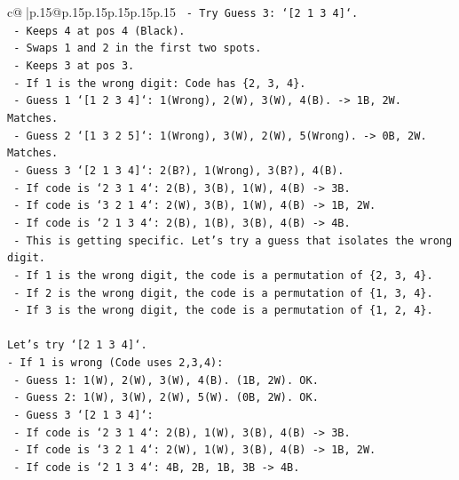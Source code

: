 \documentclass{article}
\begin{document}
{\begin{supertabular}{c@{$\;$}|p{.15\linewidth}@{}p{.15\linewidth}p{.15\linewidth}p{.15\linewidth}p{.15\linewidth}p{.15\linewidth}}
{{{\texttt{        {-} Try Guess 3: `{[}2 1 3 4{]}`.} \\
\texttt{          {-} Keeps 4 at pos 4 (Black).} \\
\texttt{          {-} Swaps 1 and 2 in the first two spots.} \\
\texttt{          {-} Keeps 3 at pos 3.} \\
\texttt{          {-} If 1 is the wrong digit: Code has \{2, 3, 4\}.} \\
\texttt{            {-} Guess 1 `{[}1 2 3 4{]}`: 1(Wrong), 2(W), 3(W), 4(B). {-}> 1B, 2W. Matches.} \\
\texttt{            {-} Guess 2 `{[}1 3 2 5{]}`: 1(Wrong), 3(W), 2(W), 5(Wrong). {-}> 0B, 2W. Matches.} \\
\texttt{            {-} Guess 3 `{[}2 1 3 4{]}`: 2(B?), 1(Wrong), 3(B?), 4(B).} \\
\texttt{              {-} If code is `2 3 1 4`: 2(B), 3(B), 1(W), 4(B) {-}> 3B.} \\
\texttt{              {-} If code is `3 2 1 4`: 2(W), 3(B), 1(W), 4(B) {-}> 1B, 2W.} \\
\texttt{              {-} If code is `2 1 3 4`: 2(B), 1(B), 3(B), 4(B) {-}> 4B.} \\
\texttt{          {-} This is getting specific. Let's try a guess that isolates the wrong digit.} \\
\texttt{          {-} If 1 is the wrong digit, the code is a permutation of \{2, 3, 4\}.} \\
\texttt{          {-} If 2 is the wrong digit, the code is a permutation of \{1, 3, 4\}.} \\
\texttt{          {-} If 3 is the wrong digit, the code is a permutation of \{1, 2, 4\}.} \\
\\ 
\texttt{Let's try `{[}2 1 3 4{]}`.} \\
\texttt{{-} If 1 is wrong (Code uses 2,3,4):} \\
\texttt{  {-} Guess 1: 1(W), 2(W), 3(W), 4(B). (1B, 2W). OK.} \\
\texttt{  {-} Guess 2: 1(W), 3(W), 2(W), 5(W). (0B, 2W). OK.} \\
\texttt{  {-} Guess 3 `{[}2 1 3 4{]}`:} \\
\texttt{    {-} If code is `2 3 1 4`: 2(B), 1(W), 3(B), 4(B) {-}> 3B.} \\
\texttt{    {-} If code is `3 2 1 4`: 2(W), 1(W), 3(B), 4(B) {-}> 1B, 2W.} \\
\texttt{    {-} If code is `2 1 3 4`: 4B, 2B, 1B, 3B {-}> 4B.} \\
}}}
\end{supertabular}}
\end{document}
